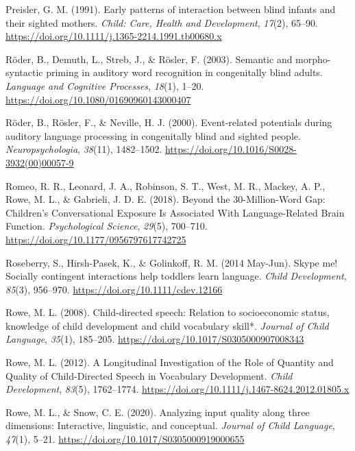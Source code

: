 \documentclass[
  man,floatsintext]{apa6}
\newlength{\cslhangindent}
\newlength{\cslentryspacingunit} %
\newenvironment{CSLReferences}[2] %
 {%
  \setlength{\parindent}{0pt}
  \ifodd #1
  \let\oldpar\par
  \def\par{\hangindent=\cslhangindent\oldpar}
  \fi
  \setlength{\parskip}{#2\cslentryspacingunit}
 }%
 {}
\begin{document}
\begin{CSLReferences}{1}{0}
\leavevmode{}%
Preisler, G. M. (1991). Early patterns of interaction between blind infants and their sighted mothers. \emph{Child: Care, Health and Development}, \emph{17}(2), 65--90. \url{https://doi.org/10.1111/j.1365-2214.1991.tb00680.x}

\leavevmode{}%
Röder, B., Demuth, L., Streb, J., \& Rösler, F. (2003). Semantic and morpho-syntactic priming in auditory word recognition in congenitally blind adults. \emph{Language and Cognitive Processes}, \emph{18}(1), 1--20. \url{https://doi.org/10.1080/01690960143000407}

\leavevmode{}%
Röder, B., Rösler, F., \& Neville, H. J. (2000). Event-related potentials during auditory language processing in congenitally blind and sighted people. \emph{Neuropsychologia}, \emph{38}(11), 1482--1502. \url{https://doi.org/10.1016/S0028-3932(00)00057-9}

\leavevmode{}%
Romeo, R. R., Leonard, J. A., Robinson, S. T., West, M. R., Mackey, A. P., Rowe, M. L., \& Gabrieli, J. D. E. (2018). Beyond the 30-{Million-Word Gap}: {Children}'s {Conversational Exposure Is Associated With Language-Related Brain Function}. \emph{Psychological Science}, \emph{29}(5), 700--710. \url{https://doi.org/10.1177/0956797617742725}

\leavevmode{}%
Roseberry, S., Hirsh-Pasek, K., \& Golinkoff, R. M. (2014 May-Jun). Skype me! {Socially} contingent interactions help toddlers learn language. \emph{Child Development}, \emph{85}(3), 956--970. \url{https://doi.org/10.1111/cdev.12166}

\leavevmode{}%
Rowe, M. L. (2008). Child-directed speech: Relation to socioeconomic status, knowledge of child development and child vocabulary skill*. \emph{Journal of Child Language}, \emph{35}(1), 185--205. \url{https://doi.org/10.1017/S0305000907008343}

\leavevmode{}%
Rowe, M. L. (2012). A {Longitudinal Investigation} of the {Role} of {Quantity} and {Quality} of {Child-Directed Speech} in {Vocabulary Development}. \emph{Child Development}, \emph{83}(5), 1762--1774. \url{https://doi.org/10.1111/j.1467-8624.2012.01805.x}

\leavevmode{}%
Rowe, M. L., \& Snow, C. E. (2020). Analyzing input quality along three dimensions: Interactive, linguistic, and conceptual. \emph{Journal of Child Language}, \emph{47}(1), 5--21. \url{https://doi.org/10.1017/S0305000919000655}


\end{CSLReferences}
\end{document}
